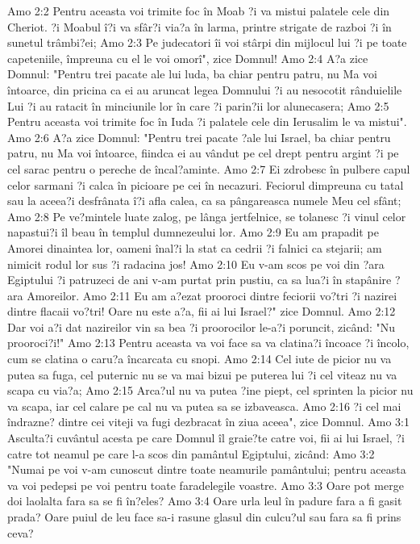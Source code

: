 Amo 2:2  Pentru aceasta voi trimite foc în Moab ?i va mistui palatele cele din Cheriot. ?i Moabul î?i va sfâr?i via?a în larma, printre strigate de razboi ?i în sunetul trâmbi?ei;
Amo 2:3  Pe judecatori îi voi stârpi din mijlocul lui ?i pe toate capeteniile, împreuna cu el le voi omorî", zice Domnul!
Amo 2:4  A?a zice Domnul: "Pentru trei pacate ale lui luda, ba chiar pentru patru, nu Ma voi întoarce, din pricina ca ei au aruncat legea Domnului ?i au nesocotit rânduielile Lui ?i au ratacit în minciunile lor în care ?i parin?ii lor alunecasera;
Amo 2:5  Pentru aceasta voi trimite foc în Iuda ?i palatele cele din Ierusalim le va mistui".
Amo 2:6  A?a zice Domnul: "Pentru trei pacate ?ale lui Israel, ba chiar pentru patru, nu Ma voi întoarce, fiindca ei au vândut pe cel drept pentru argint ?i pe cel sarac pentru o pereche de încal?aminte.
Amo 2:7  Ei zdrobesc în pulbere capul celor sarmani ?i calca în picioare pe cei în necazuri. Feciorul dimpreuna cu tatal sau la aceea?i desfrânata î?i afla calea, ca sa pângareasca numele Meu cel sfânt;
Amo 2:8  Pe ve?mintele luate zalog, pe lânga jertfelnice, se tolanesc ?i vinul celor napastui?i îl beau în templul dumnezeului lor.
Amo 2:9  Eu am prapadit pe Amorei dinaintea lor, oameni înal?i la stat ca cedrii ?i falnici ca stejarii; am nimicit rodul lor sus ?i radacina jos!
Amo 2:10  Eu v-am scos pe voi din ?ara Egiptului ?i patruzeci de ani v-am purtat prin pustiu, ca sa lua?i în stapânire ?ara Amoreilor.
Amo 2:11  Eu am a?ezat prooroci dintre feciorii vo?tri ?i nazirei dintre flacaii vo?tri! Oare nu este a?a, fii ai lui Israel?" zice Domnul.
Amo 2:12  Dar voi a?i dat nazireilor vin sa bea ?i proorocilor le-a?i poruncit, zicând: "Nu prooroci?i!"
Amo 2:13  Pentru aceasta va voi face sa va clatina?i încoace ?i încolo, cum se clatina o caru?a încarcata cu snopi.
Amo 2:14  Cel iute de picior nu va putea sa fuga, cel puternic nu se va mai bizui pe puterea lui ?i cel viteaz nu va scapa cu via?a;
Amo 2:15  Arca?ul nu va putea ?ine piept, cel sprinten la picior nu va scapa, iar cel calare pe cal nu va putea sa se izbaveasca.
Amo 2:16  ?i cel mai îndrazne? dintre cei viteji va fugi dezbracat în ziua aceea", zice Domnul.
Amo 3:1  Asculta?i cuvântul acesta pe care Domnul îl graie?te catre voi, fii ai lui Israel, ?i catre tot neamul pe care l-a scos din pamântul Egiptului, zicând:
Amo 3:2  "Numai pe voi v-am cunoscut dintre toate neamurile pamântului; pentru aceasta va voi pedepsi pe voi pentru toate faradelegile voastre.
Amo 3:3  Oare pot merge doi laolalta fara sa se fi în?eles?
Amo 3:4  Oare urla leul în padure fara a fi gasit prada? Oare puiul de leu face sa-i rasune glasul din culcu?ul sau fara sa fi prins ceva?
